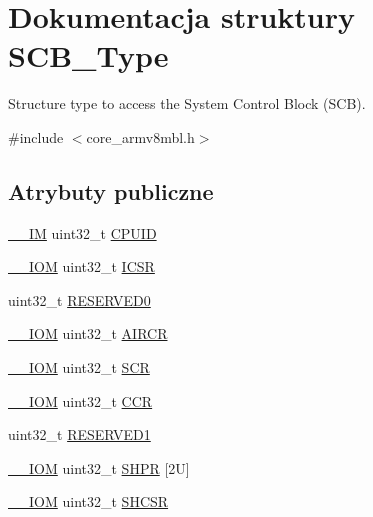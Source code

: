 \hypertarget{struct_s_c_b___type}{}\section{Dokumentacja struktury S\+C\+B\+\_\+\+Type}
\label{struct_s_c_b___type}


Structure type to access the System Control Block (S\+CB).  




{\ttfamily \#include $<$core\+\_\+armv8mbl.\+h$>$}

\subsection*{Atrybuty publiczne}
\begin{DoxyCompactItemize}
\item 
\hyperlink{core__sc300_8h_a4cc1649793116d7c2d8afce7a4ffce43}{\+\_\+\+\_\+\+IM} uint32\+\_\+t \hyperlink{struct_s_c_b___type_a21e08d546d8b641bee298a459ea73e46}{C\+P\+U\+ID}
\item 
\hyperlink{core__sc300_8h_ab6caba5853a60a17e8e04499b52bf691}{\+\_\+\+\_\+\+I\+OM} uint32\+\_\+t \hyperlink{struct_s_c_b___type_a0ca18ef984d132c6bf4d9b61cd00f05a}{I\+C\+SR}
\item 
uint32\+\_\+t \hyperlink{struct_s_c_b___type_a10960cdc703f661c83a237d9c69db23c}{R\+E\+S\+E\+R\+V\+E\+D0}
\item 
\hyperlink{core__sc300_8h_ab6caba5853a60a17e8e04499b52bf691}{\+\_\+\+\_\+\+I\+OM} uint32\+\_\+t \hyperlink{struct_s_c_b___type_ad3e5b8934c647eb1b7383c1894f01380}{A\+I\+R\+CR}
\item 
\hyperlink{core__sc300_8h_ab6caba5853a60a17e8e04499b52bf691}{\+\_\+\+\_\+\+I\+OM} uint32\+\_\+t \hyperlink{struct_s_c_b___type_a3a4840c6fa4d1ee75544f4032c88ec34}{S\+CR}
\item 
\hyperlink{core__sc300_8h_ab6caba5853a60a17e8e04499b52bf691}{\+\_\+\+\_\+\+I\+OM} uint32\+\_\+t \hyperlink{struct_s_c_b___type_a2d6653b0b70faac936046a02809b577f}{C\+CR}
\item 
uint32\+\_\+t \hyperlink{struct_s_c_b___type_adddd65958c1c4c0301f62ede0a9bf12e}{R\+E\+S\+E\+R\+V\+E\+D1}
\item 
\hyperlink{core__sc300_8h_ab6caba5853a60a17e8e04499b52bf691}{\+\_\+\+\_\+\+I\+OM} uint32\+\_\+t \hyperlink{struct_s_c_b___type_ac6259676cd7892a1b62f3fa7c0930780}{S\+H\+PR} \mbox{[}2\+U\mbox{]}
\item 
\hyperlink{core__sc300_8h_ab6caba5853a60a17e8e04499b52bf691}{\+\_\+\+\_\+\+I\+OM} uint32\+\_\+t \hyperlink{struct_s_c_b___type_a7b5ae9741a99808043394c4743b635c4}{S\+H\+C\+SR}

\end{DoxyCompactItemize}
